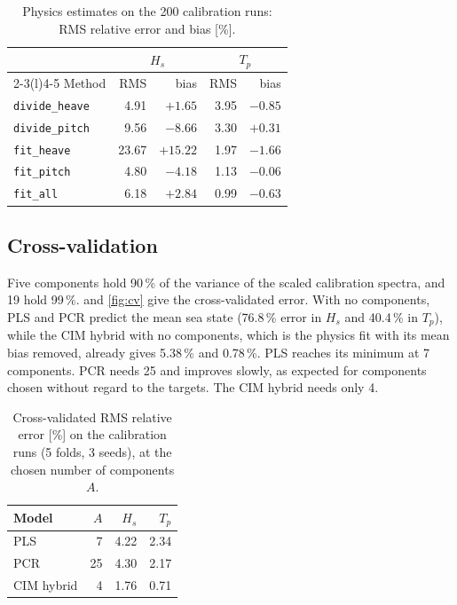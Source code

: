 \documentclass[11pt,a4paper]{article}
\newcommand{\Hs}{H_{s}}
\newcommand{\Tp}{T_{p}}
\newcommand{\pct}[1]{#1\,\%}
\begin{document}
\begin{table}[htbp]
  \centering
  \caption{Physics estimates on the 200 calibration runs: RMS relative error and bias [\%].}
  \label{tab:physics_cal}
  \begin{tabular}{@{}lrrrr@{}}
    \toprule
    & \multicolumn{2}{c}{$\Hs$} & \multicolumn{2}{c}{$\Tp$} \\
    \cmidrule(lr){2-3}\cmidrule(l){4-5}
    Method & RMS & bias & RMS & bias \\
    \midrule
    \texttt{divide\_heave} &  4.91 &  $+1.65$ & 3.95 & $-0.85$ \\
    \texttt{divide\_pitch} &  9.56 &  $-8.66$ & 3.30 & $+0.31$ \\
    \texttt{fit\_heave}    & 23.67 & $+15.22$ & 1.97 & $-1.66$ \\
    \texttt{fit\_pitch}    &  4.80 &  $-4.18$ & 1.13 & $-0.06$ \\
    \texttt{fit\_all}      &  6.18 &  $+2.84$ & 0.99 & $-0.63$ \\
    \bottomrule
  \end{tabular}
\end{table}

\subsection{Cross-validation}

Five components hold \pct{90} of the variance of the scaled calibration spectra, and 19 hold
\pct{99}.  and \cref{fig:cv} give the cross-validated error. With no components,
PLS and PCR predict the mean sea state (\pct{76.8} error in $\Hs$ and \pct{40.4} in $\Tp$), while the CIM hybrid with
no components, which is the physics fit with its mean bias removed, already gives \pct{5.38} and
\pct{0.78}. PLS reaches its minimum at 7 components. PCR needs 25 and improves slowly, as
expected for components chosen without regard to the targets. The CIM hybrid needs only 4.

\begin{table}[htbp]
  \centering
  \caption{Cross-validated RMS relative error [\%] on the calibration runs (5 folds, 3 seeds),
           at the chosen number of components $A$.}
  \label{tab:cv}
  \begin{tabular}{@{}lrrr@{}}
    \toprule
    Model & $A$ & $\Hs$ & $\Tp$ \\
    \midrule
    PLS    &  7 & 4.22 & 2.34 \\
    PCR    & 25 & 4.30 & 2.17 \\
    CIM hybrid &  4 & 1.76 & 0.71 \\
    \bottomrule
  \end{tabular}
\end{table}
\end{document}
